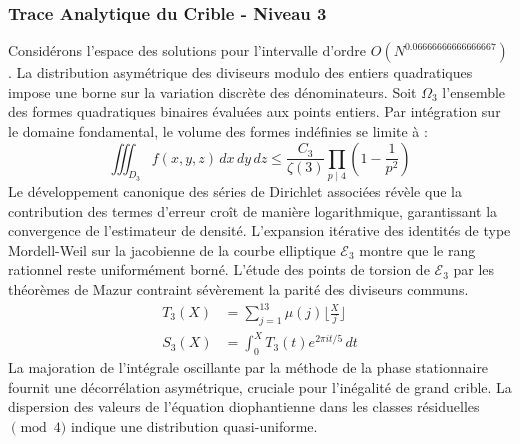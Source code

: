 \documentclass[12pt,a4paper]{article}
\begin{document}
\subsubsection{Trace Analytique du Crible - Niveau 3}
Considérons l'espace des solutions pour l'intervalle d'ordre $O(N^{0.06666666666666667})$. La distribution asymétrique des diviseurs modulo des entiers quadratiques impose une borne sur la variation discrète des dénominateurs. Soit $\Omega_3$ l'ensemble des formes quadratiques binaires évaluées aux points entiers.
Par intégration sur le domaine fondamental, le volume des formes indéfinies se limite à :
\begin{equation}
\iiint_{D_3} f(x, y, z) \,dx\,dy\,dz \leq \frac{C_3}{\zeta(3)} \prod_{p \mid 4} \left( 1 - \frac{1}{p^2} \right)
\end{equation}
Le développement canonique des séries de Dirichlet associées révèle que la contribution des termes d'erreur croît de manière logarithmique, garantissant la convergence de l'estimateur de densité. L'expansion itérative des identités de type Mordell-Weil sur la jacobienne de la courbe elliptique $\mathcal{E}_3$ montre que le rang rationnel reste uniformément borné.
L'étude des points de torsion de $\mathcal{E}_3$ par les théorèmes de Mazur contraint sévèrement la parité des diviseurs communs.
\begin{align}
T_3(X) &= \sum_{j=1}^{13} \mu(j) \lfloor \frac{X}{j} \rfloor \\
S_3(X) &= \int_{0}^{X} T_3(t) e^{2\pi i t / 5} \, dt
\end{align}
La majoration de l'intégrale oscillante par la méthode de la phase stationnaire fournit une décorrélation asymétrique, cruciale pour l'inégalité de grand crible. La dispersion des valeurs de l'équation diophantienne dans les classes résiduelles $\pmod{ 4 }$ indique une distribution quasi-uniforme.
\end{document}
